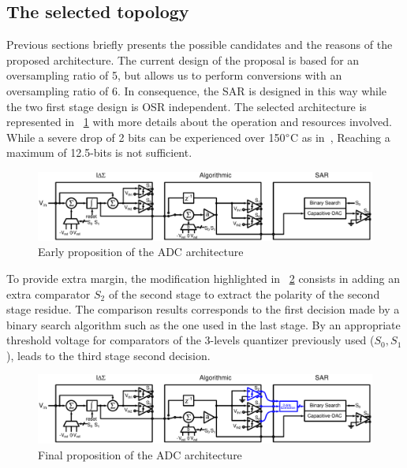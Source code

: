 \subsection{The selected topology}
\label{sec:selected-topology}
Previous sections briefly presents the possible candidates and the reasons of the proposed architecture. The current design of the proposal is based for an oversampling ratio of 5, but allows us to perform conversions with an oversampling ratio of 6. In consequence, the SAR is designed in this way while the two first stage design is OSR independent. The selected architecture is represented in \figurename~\ref{fig:early-prop-adc-architecture} with more details about the operation and resources involved. While a severe drop of 2 bits can be experienced over 150\(\degree \)C as in~\cite{Ericson2004}, Reaching a maximum of 12.5-bits is not sufficient.

\begin{figure}[htp]
	\centering
	\includegraphics[width=\textwidth]{Chapter4/Figs/architecture-full-principle.ps}
	\caption{Early proposition of the ADC architecture}
	\label{fig:early-prop-adc-architecture}
\end{figure}

To provide extra margin, the modification highlighted in \figurename~\ref{fig:final-prop-adc-architecture} consists in adding an extra comparator \(S_2\) of the second stage to extract the polarity of the second stage residue. The comparison results corresponds to the first decision made by a binary search algorithm such as the one used in the last stage. By an appropriate threshold voltage for comparators of the 3-levels quantizer previously used (\(S_0, S_1 \)), leads to the third stage second decision.

\begin{figure}[htp]
	\centering
	\includegraphics[width=\textwidth]{Chapter4/Figs/architecture-full-principle-final.ps}
	\caption{Final proposition of the ADC architecture}
	\label{fig:final-prop-adc-architecture}
\end{figure}

